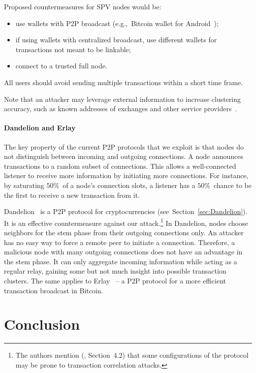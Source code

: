 Proposed countermeasures for SPV nodes would be:

\begin{itemize}
	\item use wallets with P2P broadcast (e.g.,~Bitcoin wallet for Android~\cite{BitcoinWallet});
	\item if using wallets with centralized broadcast, use different wallets for transactions not meant to be linkable;
	\item connect to a trusted full node.
\end{itemize}

All users should avoid sending multiple transactions within a short time frame.

Note that an attacker may leverage external information to increase clustering accuracy, such as known addresses of exchanges and other service providers~\cite{Walletexplorer}.

\paragraph{Dandelion and Erlay}

The key property of the current P2P protocols that we exploit is that nodes do not distinguish between incoming and outgoing connections.
A node announces transactions to a random subset of connections.
This allows a well-connected listener to receive more information by initiating more connections.
For instance, by saturating $50\%$~of a node's connection slots, a listener has a $50\%$~chance to be the first to receive a new transaction from it.

Dandelion~\cite{Fanti2018} is a P2P protocol for cryptocurrencies (see~Section~\ref{sec:Dandelion}).
It is an effective countermeasure against our attack.\footnote{The authors mention (\cite{Fanti2018}, Section~4.2) that some configurations of the protocol may be prone to transaction correlation attacks.}
In Dandelion, nodes choose neighbors for the stem phase from their outgoing connections only.
An attacker has no easy way to force a remote peer to initiate a connection.
Therefore, a malicious node with many outgoing connections does not have an advantage in the stem phase.
It can only aggregate incoming information while acting as a regular relay, gaining some but not much insight into possible transaction clusters.
The same applies to Erlay~\cite{Naumenko2019} -- a P2P protocol for a more efficient transaction broadcast in Bitcoin.


\section{Conclusion} \label{sec:Ch03Conclusion}

